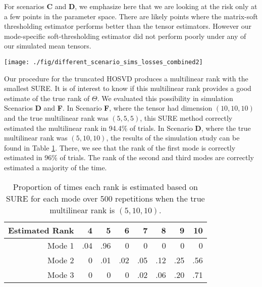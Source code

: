 For scenarios \textbf{C} and \textbf{D}, we emphasize here that we are
looking at the risk only at a few points in the parameter space. There
are likely points where the matrix-soft thresholding estimator
performs better than the tensor estimators. However our mode-specific
soft-thresholding estimator did not perform poorly under any of our
simulated mean tensors.


\begin{figure*}
  \begin{center}
    \texttt{[image: ./fig/different\_scenario\_sims\_losses\_combined2]}
    \caption{Box plots of losses for the six estimators under different
      scenarios. The estimators include the mode-specific
      soft-thresholding (ST), truncated HOSVD (Tr), matrix
      soft-thresholding (MS), Efron-Morris (EM), James-Stein (JS), and
      maximum likelihood (X) estimators. In the scenarios, the mean tensor
      was simulated to have (\textbf{A}) uncorrelated elements,
      (\textbf{B}) full rank but dispersed singular values only along mode
      1, (\textbf{C}) AR-1 covariance along mode 1, (\textbf{D}) low rank
      only along mode 1, (\textbf{E}) full rank but dispersed singular
      values along all modes, and (\textbf{F}) rank $(5,5,5)$ with all the
      same non-zero singular values.}
    \label{fig:sim.results}
  \end{center}
\end{figure*}

Our procedure for the truncated HOSVD produces a multilinear rank with
the smallest SURE. It is of interest to know if this multilinear rank
provides a good estimate of the true rank of $\Theta$. We evaluated
this possibility in simulation Scenarios \textbf{D} and \textbf{F}. In
Scenario \textbf{F}, where the tensor had dimension $(10,10,10)$ and
the true multilinear rank was $(5,5,5)$, this SURE method correctly
estimated the multilinear rank in 94.4\% of trials. In Scenario
\textbf{D}, where the true multilinear rank was $(5,10,10)$, the
results of the simulation study can be found in Table
\ref{tab:rank.est}. There, we see that the rank of the first mode is
correctly estimated in 96\% of trials. The rank of the second and
third modes are correctly estimated a majority of the time.

\begin{table}[ht]
  \centering
  \begin{tabular}{rrrrrrrr}
    \hline
    Estimated Rank & 4 & 5 & 6 & 7 & 8 & 9 & 10 \\
    \hline
    Mode 1 & .04 & .96 & 0 & 0 & 0 & 0 & 0 \\
    Mode 2 &   0 & .01 & .02 & .05 & .12 & .25 & .56 \\
    Mode 3 &   0 & 0 & 0 & .02 & .06 & .20 & .71 \\
    \hline
  \end{tabular}
  \caption{Proportion of times each rank is estimated based on SURE for each mode over 500 repetitions when the true multilinear rank is $(5,10,10)$.}
  \label{tab:rank.est}
\end{table}

